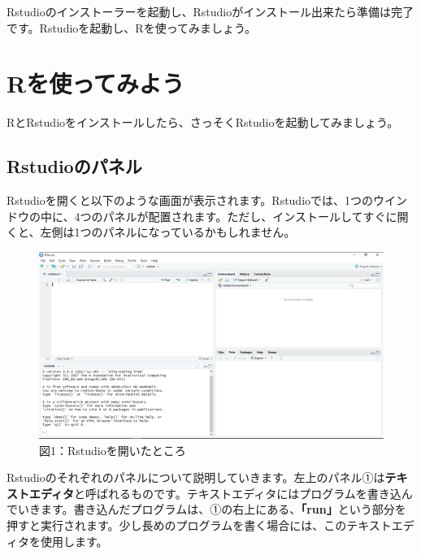 \documentclass[
  letterpaper,
  DIV=11,
  numbers=noendperiod]{scrreprt}
\begin{document}
Rstudioのインストーラーを起動し、Rstudioがインストール出来たら準備は完了です。Rstudioを起動し、Rを使ってみましょう。


\hypertarget{rux3092ux4f7fux3063ux3066ux307fux3088ux3046}{%
\chapter{Rを使ってみよう}\label{rux3092ux4f7fux3063ux3066ux307fux3088ux3046}}

RとRstudioをインストールしたら、さっそくRstudioを起動してみましょう。

\hypertarget{rstudioux306eux30d1ux30cdux30eb}{%
\section{Rstudioのパネル}\label{rstudioux306eux30d1ux30cdux30eb}}

Rstudioを開くと以下のような画面が表示されます。Rstudioでは、1つのウインドウの中に、4つのパネルが配置されます。ただし、インストールしてすぐに開くと、左側は1つのパネルになっているかもしれません。

\begin{figure}

{\centering \includegraphics{././image/Rstudio1.png}

}

\caption{図1：Rstudioを開いたところ}

\end{figure}

Rstudioのそれぞれのパネルについて説明していきます。左上のパネル①は\textbf{テキストエディタ}と呼ばれるものです。テキストエディタにはプログラムを書き込んでいきます。書き込んだプログラムは、①の右上にある、\textbf{「run」}という部分を押すと実行されます。少し長めのプログラムを書く場合には、このテキストエディタを使用します。
\end{document}
